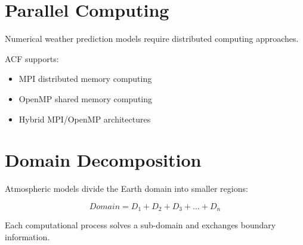 \section{Parallel Computing}


Numerical weather prediction models require distributed
computing approaches.



ACF supports:


\begin{itemize}

\item MPI distributed memory computing

\item OpenMP shared memory computing

\item Hybrid MPI/OpenMP architectures

\end{itemize}



\section{Domain Decomposition}


Atmospheric models divide the Earth domain into smaller regions:


\begin{equation}
Domain =
D_1+D_2+D_3+...+D_n
\end{equation}


Each computational process solves a sub-domain and exchanges
boundary information.
